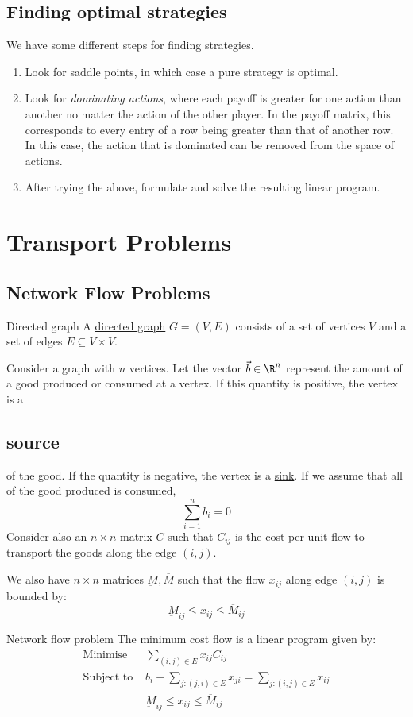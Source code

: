 \documentclass[../Main.tex]{subfiles}
\begin{document}
\subsection{Finding optimal strategies}
We have some different steps for finding strategies.
\begin{enumerate}
    \item Look for saddle points, in which case a pure strategy is optimal.
    \item Look for \textit{dominating actions}, where each payoff is greater for one action than another no matter the action of the other player. In the payoff matrix, this corresponds to every entry of a row being greater than that of another row. In this case, the action that is dominated can be removed from the space of actions.
    \item After trying the above, formulate and solve the resulting linear program.
\end{enumerate}
\section{Transport Problems}
\subsection{Network Flow Problems}
\begin{definition}{Directed graph}
    A \underline{directed graph} $G = (V, E)$ consists of a set of vertices $V$ and a set of edges $E \subseteq V \times V$.
\end{definition}
Consider a graph with $n$ vertices. Let the vector $\vec{b} \in \R^n$ represent the amount of a good produced or consumed at a vertex. If this quantity is positive, the vertex is a \subsection{source} of the good. If the quantity is negative, the vertex is a \underline{sink}. If we assume that all of the good produced is consumed,
\begin{equation*}
    \sum_{i = 1}^n b_i = 0
\end{equation*}
Consider also an $n \times n$ matrix $C$ such that $C_{ij}$ is the \underline{cost per unit flow} to transport the goods along the edge $(i, j)$.

We also have $n \times n$ matrices $\underbar{M}, \overline{M}$ such that the flow $x_{ij}$ along edge $(i, j)$ is bounded by:
\begin{equation*}
    \underbar{M}_{ij} \leq x_{ij} \leq \overline{M}_{ij}
\end{equation*}
\begin{definition}{Network flow problem}
    The minimum cost flow is a linear program given by:
    \begin{align*}
        \text{Minimise } &\sum_{(i, j) \in E} x_{ij} C_{ij} \\
        \text{Subject to } &b_i + \sum_{j : (j,i) \in E} x_{ji} = \sum_{j : (i, j) \in E} x_{ij} \\
        & \underbar{M}_{ij} \leq x_{ij} \leq \overline{M}_{ij}
    \end{align*}
\end{definition}
\end{document}
